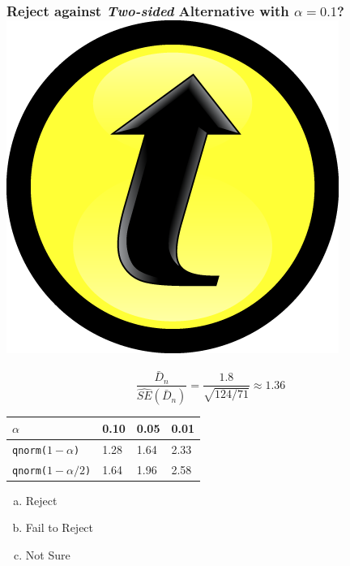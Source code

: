 \documentclass[handout]{beamer}
\begin{document}
\begin{frame}
\frametitle{Reject against \emph{Two-sided} Alternative with $\alpha = 0.1$?  \includegraphics[scale = 0.05]{./images/clicker}}

	$$\boxed{\displaystyle \frac{\bar{D}_n}{\widehat{SE}(\bar{D}_n)}= \frac{1.8}{\sqrt{124/71}} \approx 1.36} $$

\begin{center}
\begin{tabular}{l|lll}
$\alpha$ &   0.10& 0.05 &0.01\\
\hline
\texttt{qnorm($1-\alpha$)} & 1.28 &1.64 &2.33\\
\texttt{qnorm($1-\alpha/2$)} &1.64 &1.96& 2.58
\end{tabular}
\end{center}

\begin{enumerate}[(a)]
\item Reject
\item Fail to Reject
\item Not Sure
\end{enumerate}

\end{frame}
\end{document}
